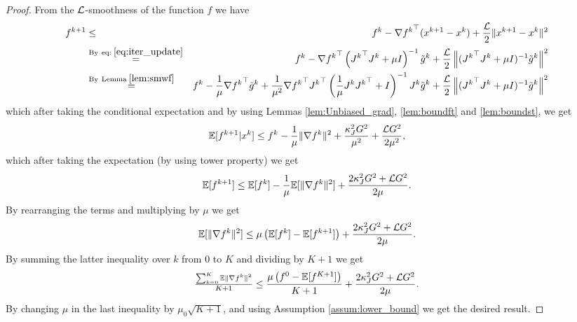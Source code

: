 \documentclass{article}
\newcommand{\E}{\mathbb{E}}
\begin{document}
\begin{proof}
From the ${\cal L}$-smoothness of the function $f$ we have  
\begin{eqnarray*}
f^{k+1}&\le & f^{k} - {\nabla f^k}^\top (x^{k+1}-x^k) + \frac{{\cal L} }{2}\|x^{k+1}-x^k\|^2\\
&\overset{{\rm By~ eq:\;}\eqref{eq:iter_update}}=& f^{k}-{\nabla f^k}^\top \left({J^k}^\top J^k + \mu I\right)^{-1} \tilde{g}^k+ \frac{{\cal L} }{2}\left\|({J^k}^\top J^k + \mu I)^{-1} \tilde{g}^k\right\|^2\\
&\overset{{\rm By~ Lemma \;}\ref{lem:smwf}}=& f^{k}-\frac{1}{\mu}{\nabla f^k}^\top \tilde{g}^k + \frac{1}{\mu^2}{\nabla f^k}^\top  {J^k}^\top\left(\frac{1}{\mu }J^k {J^k}^\top  +  I\right)^{-1}J^k \tilde{g}^k+ \frac{{\cal L} }{2}\left\|({J^k}^\top J^k + \mu I)^{-1} \tilde{g}^k\right\|^2
\end{eqnarray*} 
which after taking the conditional expectation and by using Lemmas \ref{lem:Unbiased_grad}, \ref{lem:boundft} and \ref{lem:boundst}, we get 
\begin{eqnarray*}
\mathbb{E}[f^{k+1}| x^k] \leq f^k -\frac{1}{\mu}\|\nabla f^k\|^2 + \frac{\kappa_J^2 G^2}{\mu^2}+ \frac{{\cal L} G^2}{2 \mu^2},
\end{eqnarray*}
which after taking the expectation (by using tower property) we get 
\begin{eqnarray*}
\mathbb{E}[f^{k+1}] \leq \E[f^k] -\frac{1}{\mu}\E[\|\nabla f^k\|^2] + \frac{2 \kappa_J^2 G^2 + \cL G^2}{2\mu}.
\end{eqnarray*}
By rearranging the terms and multiplying by $\mu$ we get 
\begin{eqnarray*}
\E[\|\nabla f^k\|^2] \leq \mu \left(\E[f^k] - \mathbb{E}[f^{k+1}]\right) + \frac{2 \kappa_J^2 G^2 + \cL G^2}{2\mu}.
\end{eqnarray*}
By summing the latter inequality over $k$ from $0$ to $K$ and dividing by $K+1$ we get
 \begin{eqnarray*}
 \tfrac{\sum_{k=0}^K \mathbb{E} \|\nabla f^k\|^2}{K+1} \leq \frac{\mu \left(f^0 - \mathbb{E}[f^{K+1}]\right)}{{K+1}}+\frac{2 \kappa_J^2 G^2 + {\cal L} G^2}{2\mu}.
\end{eqnarray*}
By changing $\mu$ in the last inequality by $\mu_0 {\sqrt{K+1}}$, and using Assumption \ref{assum:lower_bound} we get the desired result.
\end{proof}
\end{document}
